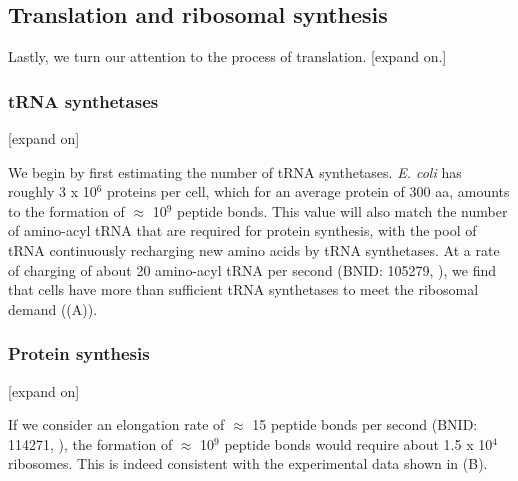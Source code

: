 \subsection{Translation and ribosomal synthesis}

Lastly, we turn our attention to the process of translation. [expand on.]

\subsubsection{tRNA synthetases}

[expand on]

We begin by first estimating the number of tRNA synthetases.  \textit{E. coli} has roughly 3 x
10$^6$ proteins per cell, which for an average protein of 300 aa, amounts to the
formation of $\approx$ 10$^9$ peptide bonds. This value will also match the
number of amino-acyl tRNA that are required for protein synthesis, with the pool
of tRNA continuously recharging new amino acids by tRNA synthetases. At a rate
of charging of about 20 amino-acyl tRNA per second (BNID: 105279,
\cite{milo2010}), we find that cells have more than sufficient tRNA synthetases
to meet the ribosomal demand ((A)).

\subsubsection{Protein synthesis}

[expand on]

If we consider an elongation rate of $\approx$ 15 peptide bonds per second
(BNID: 114271, \cite{milo2010, dai2016}), the formation of $\approx$ 10$^9$
peptide bonds would require about 1.5 x 10$^4$ ribosomes. This is indeed
consistent with the experimental data shown in (B).

